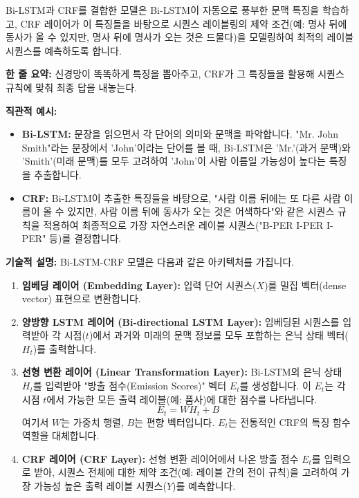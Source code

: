 \documentclass[11pt,a4paper]{article}
\begin{document}
Bi-LSTM과 CRF를 결합한 모델은 Bi-LSTM이 자동으로 풍부한 문맥 특징을 학습하고, CRF 레이어가 이 특징들을 바탕으로 시퀀스 레이블링의 제약 조건(예: 명사 뒤에 동사가 올 수 있지만, 명사 뒤에 명사가 오는 것은 드물다)을 모델링하여 최적의 레이블 시퀀스를 예측하도록 합니다.

\begin{tcolorbox}[conceptbox, title=Bi-LSTM-CRF의 핵심 아이디어]
\textbf{한 줄 요약:} 신경망이 똑똑하게 특징을 뽑아주고, CRF가 그 특징들을 활용해 시퀀스 규칙에 맞춰 최종 답을 내놓는다.

\textbf{직관적 예시:}
\begin{itemize}
    \item \textbf{Bi-LSTM:} 문장을 읽으면서 각 단어의 의미와 문맥을 파악합니다. "Mr. John Smith"라는 문장에서 'John'이라는 단어를 볼 때, Bi-LSTM은 'Mr.'(과거 문맥)와 'Smith'(미래 문맥)를 모두 고려하여 'John'이 사람 이름일 가능성이 높다는 특징을 추출합니다.
    \item \textbf{CRF:} Bi-LSTM이 추출한 특징들을 바탕으로, "사람 이름 뒤에는 또 다른 사람 이름이 올 수 있지만, 사람 이름 뒤에 동사가 오는 것은 어색하다"와 같은 시퀀스 규칙을 적용하여 최종적으로 가장 자연스러운 레이블 시퀀스("B-PER I-PER I-PER" 등)를 결정합니다.
\end{itemize}

\textbf{기술적 설명:} Bi-LSTM-CRF 모델은 다음과 같은 아키텍처를 가집니다.
\begin{enumerate}
    \item \textbf{임베딩 레이어 (Embedding Layer):} 입력 단어 시퀀스($X$)를 밀집 벡터(dense vector) 표현으로 변환합니다.
    \item \textbf{양방향 LSTM 레이어 (Bi-directional LSTM Layer):} 임베딩된 시퀀스를 입력받아 각 시점($t$)에서 과거와 미래의 문맥 정보를 모두 포함하는 은닉 상태 벡터($H_t$)를 출력합니다.
    \item \textbf{선형 변환 레이어 (Linear Transformation Layer):} Bi-LSTM의 은닉 상태 $H_t$를 입력받아 "방출 점수(Emission Scores)" 벡터 $E_t$를 생성합니다. 이 $E_t$는 각 시점 $t$에서 가능한 모든 출력 레이블(예: 품사)에 대한 점수를 나타냅니다.
    \[ E_t = W H_t + B \]
    여기서 $W$는 가중치 행렬, $B$는 편향 벡터입니다. $E_t$는 전통적인 CRF의 특징 함수 역할을 대체합니다.
    \item \textbf{CRF 레이어 (CRF Layer):} 선형 변환 레이어에서 나온 방출 점수 $E_t$를 입력으로 받아, 시퀀스 전체에 대한 제약 조건(예: 레이블 간의 전이 규칙)을 고려하여 가장 가능성 높은 출력 레이블 시퀀스($Y$)를 예측합니다.
\end{enumerate}
\end{tcolorbox}
\end{document}
